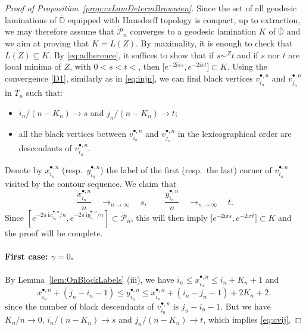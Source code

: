 \documentclass[AHL,XML,longabstracts,Unicode]{cedram}
\newcommand{\D}{\mathbb{D}}
\def\PPP{\mathcal P}
\begin{document}
\begin{proof}[Proof of Proposition~\ref{prop:cvLamDetermBrownien}]
Since the set of all geodesic laminations of $\overline{\D}$ equipped with Hausdorff topology is compact, up to extraction, we may therefore assume that  $ \dot{\PPP}_{n}$  converges to a geodesic lamination $K$ of $\overline{\D}$ and we aim at proving that $K=L(Z)$.
By maximality, it is enough to check that $ L(Z) \subseteq K$.
By \eqref{eq:adherence},  it suffices to show that if $s \sim^{Z} t$  and if $s$ nor $t$ are local minima of $Z$, with $0<s < t<$, then $\big[e^{-2\textrm{i} \pi s},e^{-2\textrm{i} \pi t}\big] \subset K$.
Using the convergence \ref{D1}, similarly as in \cref{eq:injn}, we can find black vertices
$v^{\bullet,n}_{i_{n}}$ and $v^{\bullet,n}_{j_{n}}$ in $T_{n}$
such that:
\begin{itemize}
\item $i_{n}/(n-K_{n}) \rightarrow s$  and $j_{n}/(n-K_{n}) \rightarrow t$;
\item all the black vertices between $v^{\bullet,n}_{i_{n}}$ and $ v^{\bullet,n}_{j_{n}}$
  in the lexicographical order are descendants of  $v^{\bullet,n}_{i_{n}}$.
\end{itemize}
  Denote by  $x^{\bullet,n}_{i_{n}}$ (resp.~$y ^{\bullet,n}_{i_{n}}$)
  the label of the first (resp.~the last) corner of $v^{\bullet,n}_{i_{n}}$ visited by the contour sequence. We claim that
  \begin{equation}
\label{eq:cvij} \frac{x^{\bullet,n}_{i_{n}}}{n}  \quad \mathop{\longrightarrow}_{n \rightarrow \infty} \quad s, \qquad \frac{y ^{\bullet,n}_{i_{n}}}{n}  \quad \mathop{\longrightarrow}_{n \rightarrow \infty} \quad t.
\end{equation}
Since $[e^{-2\pi\, \textrm{i} {x^{\bullet,n}_{i_{n}}}/{n}}, e^{-2\pi\, \textrm{i} {y ^{\bullet,n}_{i_{n}}}/{n}}] \subset \dot{\PPP}_{n}$, this will then imply $\big[e^{-2\textrm{i} \pi s},e^{-2\textrm{i} \pi t}\big] \subset K$ and the proof will be complete.


\paragraph*{First case: $\gamma=0$.} By  Lemma~\ref{lem:OnBlockLabels}  (iii),
we have $i_{n} \leq x^{\bullet,n}_{i_{n}} \leq i_{n}+ K_{n}+1$ and
\[x^{\bullet,n}_{i_{n}}+ (j_n-i_n-1) \leq y^{\bullet,n}_{i_{n}} \leq x^{\bullet,n}_{i_{n}}+(i_n-j_n-1) +2 K_{n}+2,\]
since the number of black descendants of $v^{\bullet,n}_{i_{n}}$ is $j_{n}-i_{n}-1$.
But we have ${K_{n}}/{n} \rightarrow 0$, $i_{n}/(n-K_{n}) \rightarrow s$  and $j_{n}/(n-K_{n}) \rightarrow t$,
which implies \eqref{eq:cvij}.


\end{proof}
\end{document}
